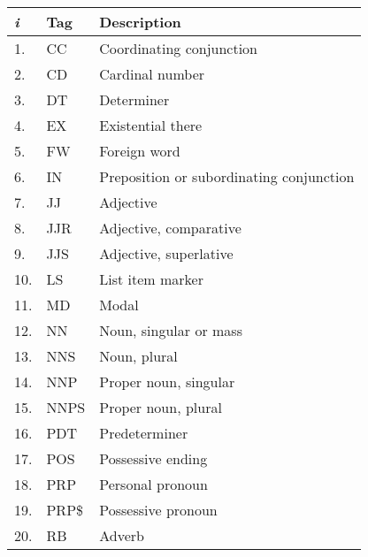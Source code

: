 \documentclass[
	a4paper,
	pdftex,
	12pt,	
	footinclude=true,
	fleqn,
	final,
	]{report}%
\begin{document}
\begin{table}[h]
\centering
\begin{tabular}{m{1cm} m{2cm} m{9cm}}
\toprule
\emph{i}      & Tag   & Description                              \\\toprule
1.     & CC    & Coordinating conjunction                 \\
2.     & CD    & Cardinal number                          \\
3.     & DT    & Determiner                               \\
4.     & EX    & Existential there                        \\
5.     & FW    & Foreign word                             \\
6.     & IN    & Preposition or subordinating conjunction \\
7.     & JJ    & Adjective                                \\
8.     & JJR   & Adjective, comparative                   \\
9.     & JJS   & Adjective, superlative                   \\
10.    & LS    & List item marker                         \\
11.    & MD    & Modal                                    \\
12.    & NN    & Noun, singular or mass                   \\
13.    & NNS   & Noun, plural                             \\
14.    & NNP   & Proper noun, singular                    \\
15.    & NNPS  & Proper noun, plural                      \\
16.    & PDT   & Predeterminer                            \\
17.    & POS   & Possessive ending                        \\
18.    & PRP   & Personal pronoun                         \\
19.    & PRP\$ & Possessive pronoun                       \\
20.    & RB    & Adverb                                   \\

\end{tabular}
\end{table}
\end{document}
